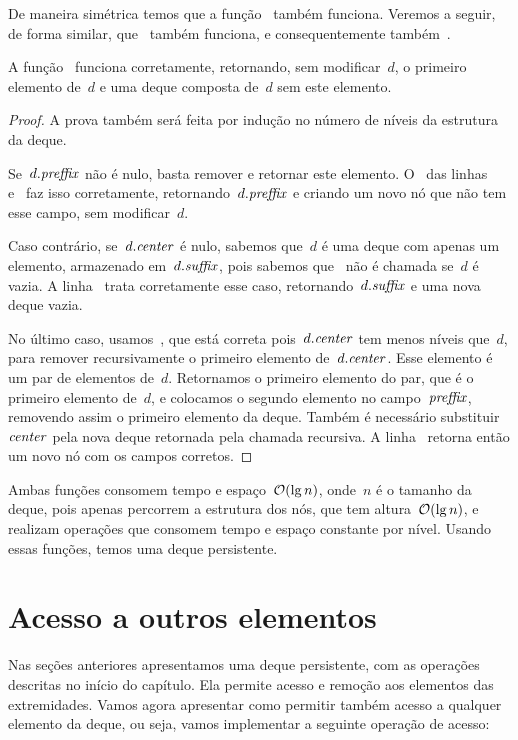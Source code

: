 \documentclass[../../main.tex]{subfiles}
\begin{document}
De maneira simétrica temos que a função~ também funciona. Veremos a seguir, de forma similar, que~ também funciona, e consequentemente também~.

\begin{proposition}
A função~ funciona corretamente, retornando, sem modificar~$d$, o primeiro elemento de~$d$ e uma deque composta de~$d$ sem este elemento.
\end{proposition}

\begin{proof}
A prova também será feita por indução no número de níveis da estrutura da deque.

Se~$d.\mathit{preffix}$ não é nulo, basta remover e retornar este elemento. O~ das linhas~ e~ faz isso corretamente, retornando~$d.\mathit{preffix}$ e criando um novo nó que não tem esse campo, sem modificar~$d$.

Caso contrário, se~$d.\mathit{center}$ é nulo, sabemos que~$d$ é uma deque com apenas um elemento, armazenado em~$d.\mathit{suffix}$, pois sabemos que~ não é chamada se~$d$ é vazia. A linha~ trata corretamente esse caso, retornando~$d.\mathit{suffix}$ e uma nova deque vazia.

No último caso, usamos~, que está correta pois~$d.\mathit{center}$ tem menos níveis que~$d$, para remover recursivamente o primeiro elemento de~$d.\mathit{center}$. Esse elemento é um par de elementos de~$d$. Retornamos o primeiro elemento do par, que é o primeiro elemento de~$d$, e colocamos o segundo elemento no campo~$\mathit{preffix}$, removendo assim o primeiro elemento da deque. Também é necessário substituir~$\mathit{center}$ pela nova deque retornada pela chamada recursiva. A linha~ retorna então um novo nó com os campos corretos.
\end{proof}

Ambas funções consomem tempo e espaço~$\mathcal{O}(\lg n)$, onde~$n$ é o tamanho da deque, pois apenas percorrem a estrutura dos nós, que tem altura~$\mathcal{O}(\lg n)$, e realizam operações que consomem tempo e espaço constante por nível. Usando essas funções, temos uma deque persistente.

\section{Acesso a outros elementos}

Nas seções anteriores apresentamos uma deque persistente, com as operações descritas no início do capítulo. Ela permite acesso e remoção aos elementos das extremidades. Vamos agora apresentar como permitir também acesso a qualquer elemento da deque, ou seja, vamos implementar a seguinte operação de acesso:
\end{document}
